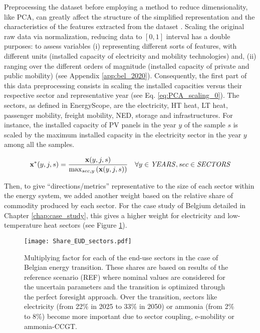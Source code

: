 \noindent
Preprocessing the dataset before employing a method to reduce dimensionality, like \gls{PCA}, can greatly affect the structure of the simplified representation and the characteristics of the features extracted from the dataset \cite{parente2013principal,peerenboom2015dimension}. Scaling the original raw data via normalization, \ie reducing data to $[0, 1]$ interval has a double purposes: to assess variables (i) representing different sorts of features, with different units (\eg installed capacity of electricity and mobility technologies) and, (ii) ranging over the different orders of magnitude (\eg installed capacity of private and public mobility) (see Appendix \ref{app:bel_2020}).  Consequently, the first part of this data preprocessing consists in scaling the installed capacities versus their respective sector and representative year (see Eq. \ref{eq:PCA_scaling_0}). The sectors, as defined in EnergyScope, are the electricity, \gls{HT} heat, \gls{LT} heat, passenger mobility, freight mobility, \gls{NED}, storage and infrastructures. For instance, the installed capacity of \gls{PV} panels in the year $y$ of the sample $s$ is scaled by the maximum installed capacity in the electricity sector in the year $y$ among all the samples.

\begin{equation}
 \label{eq:PCA_scaling_0}
\textbf{x}^{*}(y,j,s)=\frac{\textbf{x}(y,j,s)}{\mathrm{max}_{sec,y}\left(\textbf{x}(y,j,s)\right)}
 \quad \forall y \in \text{\emph{YEARS}}, sec \in \text{\emph{SECTORS}}
\end{equation}

Then, to give ``directions/metrics'' representative to the size of each sector within the energy system, we added another weight based on the relative share of commodity produced by each sector. For the case study of Belgium detailed in Chapter \ref{chap:case_study}, this gives a higher weight for electricity and low-temperature heat sectors (see Figure \ref{fig:Share_EUD_sectors}). 

\begin{figure}[!htbp]
\centering
\texttt{[image: Share\_EUD\_sectors.pdf]}
\caption{Multiplying factor for each of the end-use sectors in the case of Belgian energy transition. These shares are based on results of the reference scenario (REF) where nominal values are considered for the uncertain parameters and the transition is optimized through the perfect foresight approach. Over the transition, sectors like electricity (\ie from 22\% in 2025 to 33\% in 2050) or ammonia (\ie from 2\% to 8\%) become more important due to sector coupling, \eg e-mobility or ammonia-\gls{CCGT}.}
\label{fig:Share_EUD_sectors}
\end{figure}

